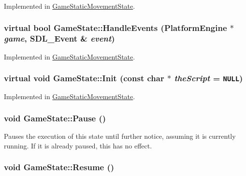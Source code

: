Implemented in \hyperlink{class_game_static_movement_state_2c2d82b3dbc8e431682b53ce05294f27}{GameStaticMovementState}.\hypertarget{class_game_state_de7bd9bda91253614322ca0ea77b7a14}{
\subsubsection[{HandleEvents}]{\setlength{\rightskip}{0pt plus 5cm}virtual bool GameState::HandleEvents ({\bf PlatformEngine} $\ast$ {\em game}, \/  SDL\_\-Event \& {\em event})}}
\label{dd/d87/class_game_state_de7bd9bda91253614322ca0ea77b7a14}




Implemented in \hyperlink{class_game_static_movement_state_c73d6f93fee2ac6cb2788eb2984bb305}{GameStaticMovementState}.\hypertarget{class_game_state_488fd39ceb2907b13e11f03607f16e5f}{
\subsubsection[{Init}]{\setlength{\rightskip}{0pt plus 5cm}virtual void GameState::Init (const char $\ast$ {\em theScript} = {\tt NULL})}}
\label{dd/d87/class_game_state_488fd39ceb2907b13e11f03607f16e5f}




Implemented in \hyperlink{class_game_static_movement_state_4cb4be5ea96a6bb7b06c79bed64c355d}{GameStaticMovementState}.\hypertarget{class_game_state_0c47c6969a4e0bb32d6cdf7bf9376817}{
\subsubsection[{Pause}]{\setlength{\rightskip}{0pt plus 5cm}void GameState::Pause ()}}
\label{dd/d87/class_game_state_0c47c6969a4e0bb32d6cdf7bf9376817}


Pauses the execution of this state until further notice, assuming it is currently running. If it is already paused, this has no effect. \hypertarget{class_game_state_d12ece3c3fb066281b73b07a315f04e8}{
\subsubsection[{Resume}]{\setlength{\rightskip}{0pt plus 5cm}void GameState::Resume ()}}
\label{dd/d87/class_game_state_d12ece3c3fb066281b73b07a315f04e8}



